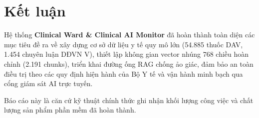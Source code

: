 \documentclass[12pt,a4paper]{article}
\begin{document}
\section{Kết luận}

Hệ thống \textbf{Clinical Ward \& Clinical AI Monitor} đã hoàn thành toàn diện các mục tiêu đề ra về xây dựng cơ sở dữ liệu y tế quy mô lớn (54.885 thuốc DAV, 1.454 chuyên luận DĐVN V), thiết lập không gian vector nhúng 768 chiều hoàn chỉnh (2.191 chunks), triển khai đường ống RAG chống ảo giác, đảm bảo an toàn điều trị theo các quy định hiện hành của Bộ Y tế và vận hành minh bạch qua cổng giám sát AI trực tuyến.

Báo cáo này là căn cứ kỹ thuật chính thức ghi nhận khối lượng công việc và chất lượng sản phẩm phần mềm đã hoàn thành.
\end{document}
